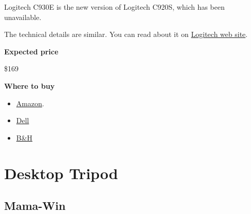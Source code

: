 \begin{gram}
Logitech C930E is the new version of Logitech C920S, which has been unavailable.

The technical details are similar.  You can read about it on
%
\href{https://www.logitech.com/en-us/product/c930e-webcam}{Logitech web site}.

\textbf{Expected price}

\$169

\textbf{Where to buy}

\begin{itemize}
\item
\href{https://www.amazon.com/Logitech-C930e-1080P-Video-Webcam/dp/B00CRJWW2G}{Amazon}.
\item 
\href{https://www.dell.com/en-ca/work/shop/logitech-c930e-hd-webcam/apd/a6880908/pc-accessories}{Dell}
\item
\href{https://www.bhphotovideo.com/c/product/977620-REG/logitech_960_000971_c930e_webcam_usb.html}{B\&H}
\end{itemize}

\end{gram}

\section{Desktop Tripod}

\subsection{Mama-Win}

